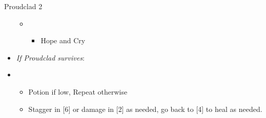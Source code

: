 \begin{battle}[2:01]{Proudclad 2}
\begin{itemize}
\begin{itemize}
\begin{itemize}
				            \end{itemize}
				      \item \second
				            \begin{itemize}
					            \item Hope and Cry
				            \end{itemize}
			      \end{itemize}
			\item \textit{If Proudclad survives}:
			\item \fourth
			      \begin{itemize}
				      \item Potion if low, Repeat otherwise
				      \item Stagger in [6] or damage in [2] as needed, go back to [4] to heal as needed.
			      \end{itemize}
		\end{itemize}
\end{battle}
\columnbreak